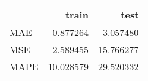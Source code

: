\begin{tabular}{lrr}
\toprule
{} &      train &       test \\
\midrule
MAE  &   0.877264 &   3.057480 \\
MSE  &   2.589455 &  15.766277 \\
MAPE &  10.028579 &  29.520332 \\
\bottomrule
\end{tabular}
